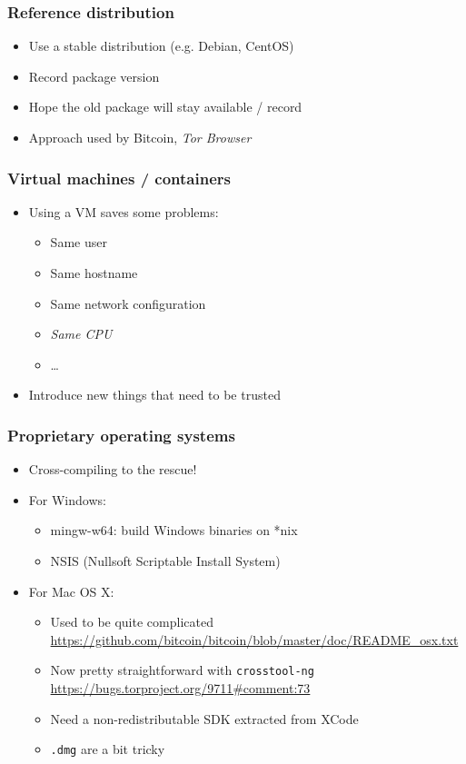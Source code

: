 \documentclass[14pt,aspectratio=169]{beamer}
\begin{document}
\begin{frame}
 \frametitle{Reference distribution}

 \begin{itemize}
  \item Use a stable distribution (e.g. Debian, CentOS)
  \item Record package version
  \item Hope the old package will stay available / record
  \item Approach used by Bitcoin, \textit{Tor Browser}
 \end{itemize}
\end{frame}

\begin{frame}
 \frametitle{Virtual machines / containers}

 \begin{itemize}
  \item Using a VM saves some problems:
   \begin{itemize}
    \item Same user
    \item Same hostname
    \item Same network configuration
    \item \textit{Same CPU}
    \item …
   \end{itemize}
  \item Introduce new things that need to be trusted
 \end{itemize}
\end{frame}

\begin{frame}
 \frametitle{Proprietary operating systems}

 \begin{itemize}
  \item Cross-compiling to the rescue!
  \item For Windows:
   \begin{itemize}
     \item mingw-w64: build Windows binaries on *nix
     \item NSIS (Nullsoft Scriptable Install System)
   \end{itemize}
  \item For Mac OS X:
   \begin{itemize}
     \item Used to be quite complicated \\
       {\footnotesize \url{https://github.com/bitcoin/bitcoin/blob/master/doc/README\_osx.txt}}
     \item Now pretty straightforward with \texttt{crosstool-ng} \\
       {\footnotesize \url{https://bugs.torproject.org/9711\#comment:73}}
     \item Need a non-redistributable SDK extracted from XCode
     \item \texttt{.dmg} are a bit tricky
   \end{itemize}
 \end{itemize}
\end{frame}
\end{document}
